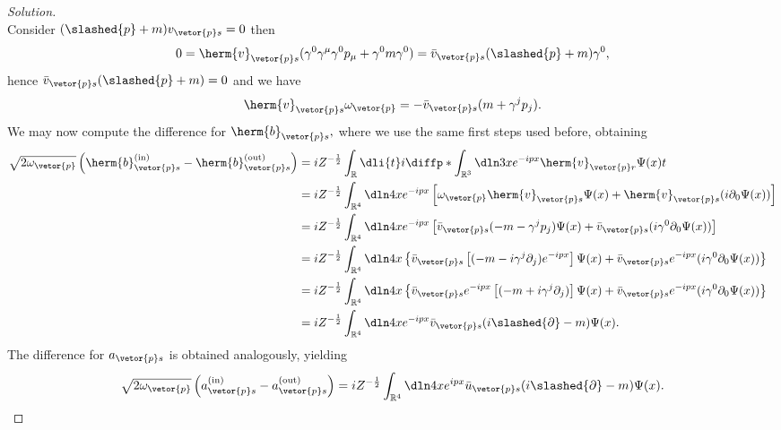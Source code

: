 \begin{proof}[Solution]
\begin{equation*}
   \end{equation*}
   Consider \((\slashed{p} + m) v_{\vetor{p}s} = 0\) then 
   \begin{equation*}
      0 = \herm{v}_{\vetor{p}s} (\gamma^0 \gamma^\mu \gamma^0 p_\mu + \gamma^0 m \gamma^0) = \bar{v}_{\vetor{p}s} ( \slashed{p} + m) \gamma^0,
   \end{equation*}
   hence \(\bar{v}_{\vetor{p}s} (\slashed{p} + m) = 0\) and we have
   \begin{equation*}
      \herm{v}_{\vetor{p}s} \omega_{\vetor{p}} = -\bar{v}_{\vetor{p}s} (m + \gamma^j p_j).
   \end{equation*}
   We may now compute the difference for \(\herm{b}_{\vetor{p}s},\) where we use the same first steps used before, obtaining
   \begin{align*}
      \sqrt{2 \omega_{\vetor{p}}} \left({\herm{b}}_{\vetor{p} s}^{(\mathrm{in})} - {\herm{b}}_{\vetor{p} s}^{(\mathrm{out})}\right) 
        &= iZ^{-\frac12} \int_{\mathbb{R}} \dli{t} i\diffp*{\int_{\mathbb{R}^3} \dln3x e^{-ipx} \herm{v}_{\vetor{p}r} \Psi(x)}{t}\\
        &= iZ^{-\frac12} \int_{\mathbb{R}^4} \dln4x  e^{-ipx} \left[\omega_{\vetor{p}} \herm{v}_{\vetor{p}s}\Psi(x) + \herm{v}_{\vetor{p}s}(i \partial_0 \Psi(x))\right]\\
        &= iZ^{-\frac12} \int_{\mathbb{R}^4} \dln4x  e^{-ipx} \left[ \bar{v}_{\vetor{p}s}(-m - \gamma^jp_j)\Psi(x) + \bar{v}_{\vetor{p}s}(i\gamma^0 \partial_0 \Psi(x))\right]\\
        &= iZ^{-\frac12} \int_{\mathbb{R}^4} \dln4x   \left\{ \bar{v}_{\vetor{p}s}\left[(-m - i\gamma^j \partial_j)e^{-ipx}\right]\Psi(x) + \bar{v}_{\vetor{p}s}e^{-ipx}(i\gamma^0 \partial_0 \Psi(x))\right\}\\
        &= iZ^{-\frac12} \int_{\mathbb{R}^4} \dln4x   \left\{ \bar{v}_{\vetor{p}s}e^{-ipx}\left[(-m + i\gamma^j \partial_j)\right]\Psi(x) + \bar{v}_{\vetor{p}s}e^{-ipx}(i\gamma^0 \partial_0 \Psi(x))\right\}\\
        &= i Z^{-\frac12} \int_{\mathbb{R}^4} \dln4x e^{-ipx} \bar{v}_{\vetor{p}s} (i \slashed{\partial} - m) \Psi(x).
   \end{align*}
   The difference for \(a_{\vetor{p}s}\) is obtained analogously, yielding
   \begin{equation*}
      \sqrt{2 \omega_{\vetor{p}}} \left({a}_{\vetor{p} s}^{(\mathrm{in})} - {a}_{\vetor{p} s}^{(\mathrm{out})}\right) 
        = i Z^{-\frac12} \int_{\mathbb{R}^4} \dln4x e^{ipx} \bar{u}_{\vetor{p}s} (i \slashed{\partial} - m) \Psi(x).
   \end{equation*}


\end{proof}
